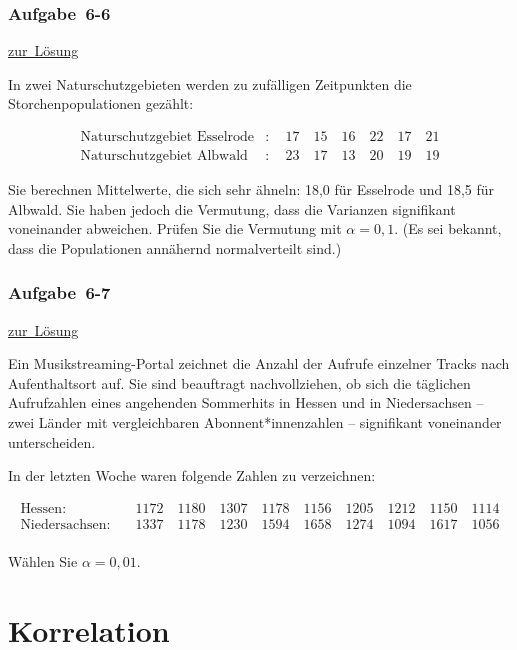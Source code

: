 \documentclass[
  11pt,
  ngerman,
  a4paper,
]{report}
\begin{document}
\hypertarget{aufgabe-6-6}{%
\subsection{Aufgabe~6-6}\label{aufgabe-6-6}}

\protect\hyperlink{loesung-6-6}{zur~Lösung}

In zwei Naturschutzgebieten werden zu zufälligen Zeitpunkten die Storchenpopulationen gezählt:

\[\begin{aligned}
\textrm{Naturschutzgebiet Esselrode}&: \quad17\quad15\quad16\quad22\quad17\quad21\\
\textrm{Naturschutzgebiet Albwald}&:\quad 23\quad17\quad13\quad20\quad19\quad19
\end{aligned}\]

Sie berechnen Mittelwerte, die sich sehr ähneln: 18,0 für Esselrode und 18,5 für Albwald. Sie haben jedoch die Vermutung, dass die Varianzen signifikant voneinander abweichen. Prüfen Sie die Vermutung mit \(\alpha=0{,}1\). (Es sei bekannt, dass die Populationen annähernd normalverteilt sind.)

\hypertarget{aufgabe-6-7}{%
\subsection{Aufgabe~6-7}\label{aufgabe-6-7}}

\protect\hyperlink{loesung-6-7}{zur~Lösung}

Ein Musikstreaming-Portal zeichnet die Anzahl der Aufrufe einzelner Tracks nach Aufenthaltsort auf. Sie sind beauftragt nachvollziehen, ob sich die täglichen Aufrufzahlen eines angehenden Sommerhits in Hessen und in Niedersachsen -- zwei Länder mit vergleichbaren Abonnent*innenzahlen -- signifikant voneinander unterscheiden.

In der letzten Woche waren folgende Zahlen zu verzeichnen:

\[\begin{aligned}
\textrm{Hessen}: & \quad 1172 \quad 1180 \quad 1307 \quad 1178 \quad 1156 \quad 1205 \quad 1212 \quad 1150 \quad 1114\\
\textrm{Niedersachsen}: & \quad 1337 \quad 1178 \quad 1230 \quad 1594 \quad 1658 \quad 1274 \quad 1094 \quad 1617 \quad 1056\\
\end{aligned}\]

Wählen Sie \(\alpha = 0{,}01\).

\hypertarget{korrelation}{%
\chapter{Korrelation}\label{korrelation}}
\end{document}

